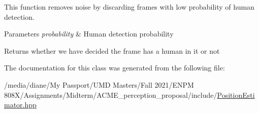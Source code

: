 This function removes noise by discarding frames with low probability of human detection. 


\begin{DoxyParams}{Parameters}
{\em probability} & Human detection probability \\
\hline
\end{DoxyParams}
\begin{DoxyReturn}{Returns}
whether we have decided the frame has a human in it or not 
\end{DoxyReturn}


The documentation for this class was generated from the following file\+:\begin{DoxyCompactItemize}
\item 
/media/diane/\+My Passport/\+U\+M\+D Masters/\+Fall 2021/\+E\+N\+P\+M 808\+X/\+Assignments/\+Midterm/\+A\+C\+M\+E\+\_\+perception\+\_\+proposal/include/\hyperlink{_position_estimator_8hpp}{Position\+Estimator.\+hpp}\end{DoxyCompactItemize}
